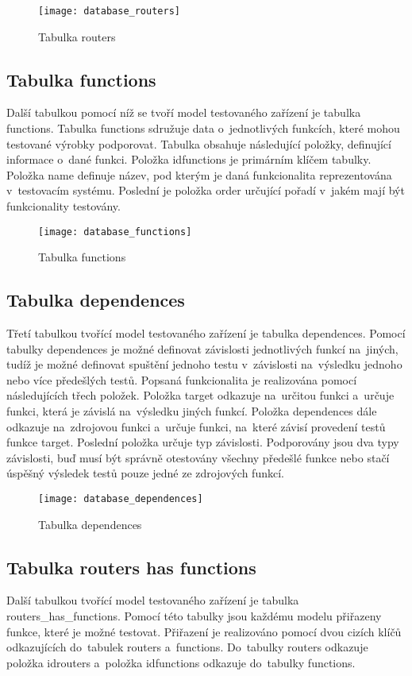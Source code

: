 \begin{figure}[h]
  \centering
  \texttt{[image: database\_routers]}
  \caption{Tabulka routers}
  \label{fig:database_routers}
\end{figure}

\subsection{Tabulka functions}
Další tabulkou pomocí níž se tvoří model testovaného zařízení je tabulka functions. Tabulka functions sdružuje data o~jednotlivých funkcích, které mohou testované výrobky podporovat. Tabulka obsahuje následující položky, definující informace o~dané funkci. Položka idfunctions je primárním klíčem tabulky. Položka name definuje název, pod kterým je daná funkcionalita reprezentována v~testovacím systému. Poslední je položka order určující pořadí v~jakém mají být funkcionality testovány.

\begin{figure}[h]
  \centering
  \texttt{[image: database\_functions]}
  \caption{Tabulka functions}
  \label{fig:database_functions}
\end{figure}

\subsection{Tabulka dependences}
Třetí tabulkou tvořící model testovaného zařízení je tabulka dependences. Pomocí tabulky dependences je možné definovat závislosti jednotlivých funkcí na~jiných, tudíž je možné definovat spuštění jednoho testu v~závislosti na~výsledku jednoho nebo více předešlých testů. Popsaná funkcionalita je realizována pomocí následujících třech položek. Položka target odkazuje na~určitou funkci a~určuje funkci, která je závislá na~výsledku jiných funkcí. Položka dependences dále odkazuje na~zdrojovou funkci a~určuje funkci, na~které závisí provedení testů funkce target. Poslední položka určuje typ závislosti. Podporovány jsou dva typy závislosti, buď musí být správně otestovány všechny předešlé funkce nebo stačí úspěšný výsledek testů pouze jedné ze zdrojových funkcí.

\begin{figure}[h]
  \centering
  \texttt{[image: database\_dependences]}
  \caption{Tabulka dependences}
  \label{fig:database_dependences}
\end{figure}

\subsection{Tabulka routers has functions}
Další tabulkou tvořící model testovaného zařízení je tabulka routers\_has\_functions. Pomocí této tabulky jsou každému modelu přiřazeny funkce, které je možné testovat. Přiřazení je realizováno pomocí dvou cizích klíčů odkazujících do~tabulek routers a~functions. Do~tabulky routers odkazuje položka idrouters a~položka idfunctions odkazuje do~tabulky functions.

